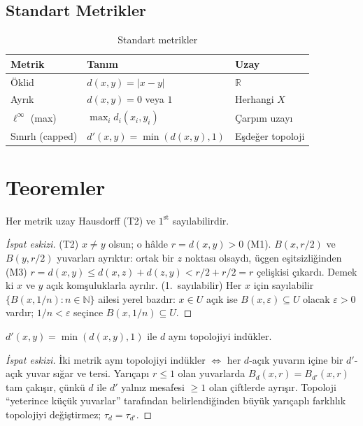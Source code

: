 \subsection{Standart Metrikler}

\begin{table}[h]
\centering
\begin{tabular}{lll}
\toprule
\textbf{Metrik} & \textbf{Tanım} & \textbf{Uzay} \\
\midrule
Öklid & $d(x,y) = |x-y|$ & $\mathbb{R}$ \\
Ayrık & $d(x,y) = 0$ veya $1$ & Herhangi $X$ \\
$\ell^\infty$ (max) & $\max_i d_i(x_i,y_i)$ & Çarpım uzayı \\
Sınırlı (capped) & $d'(x,y) = \min(d(x,y),1)$ & Eşdeğer topoloji \\
\bottomrule
\end{tabular}
\caption{Standart metrikler}
\end{table}

\section{Teoremler}

\begin{theorem}
Her metrik uzay Hausdorff (T2) ve $1^{\text{st}}$ sayılabilirdir.
\end{theorem}

\begin{proof}[İspat eskizi]
(T2) $x \neq y$ olsun; o hâlde $r = d(x,y) > 0$ (M1). $B(x, r/2)$ ve $B(y, r/2)$
yuvarları ayrıktır: ortak bir $z$ noktası olsaydı, üçgen eşitsizliğinden (M3)
$r = d(x,y) \leq d(x,z) + d(z,y) < r/2 + r/2 = r$ çelişkisi çıkardı. Demek ki $x$ ve
$y$ açık komşuluklarla ayrılır. (1.\ sayılabilir) Her $x$ için sayılabilir
$\{B(x, 1/n) : n \in \mathbb{N}\}$ ailesi yerel bazdır: $x \in U$ açık ise
$B(x,\varepsilon) \subseteq U$ olacak $\varepsilon > 0$ vardır; $1/n < \varepsilon$
seçince $B(x, 1/n) \subseteq U$.
\end{proof}

\begin{theorem}
$d'(x,y) = \min(d(x,y),1)$ ile $d$ aynı topolojiyi indükler.
\end{theorem}

\begin{proof}[İspat eskizi]
İki metrik aynı topolojiyi indükler $\Leftrightarrow$ her $d$-açık yuvarın içine bir
$d'$-açık yuvar sığar ve tersi. Yarıçapı $r \leq 1$ olan yuvarlarda
$B_d(x, r) = B_{d'}(x, r)$ tam çakışır, çünkü $d$ ile $d'$ yalnız mesafesi $\geq 1$
olan çiftlerde ayrışır. Topoloji ``yeterince küçük yuvarlar'' tarafından
belirlendiğinden büyük yarıçaplı farklılık topolojiyi değiştirmez; $\tau_d = \tau_{d'}$.
\end{proof}

